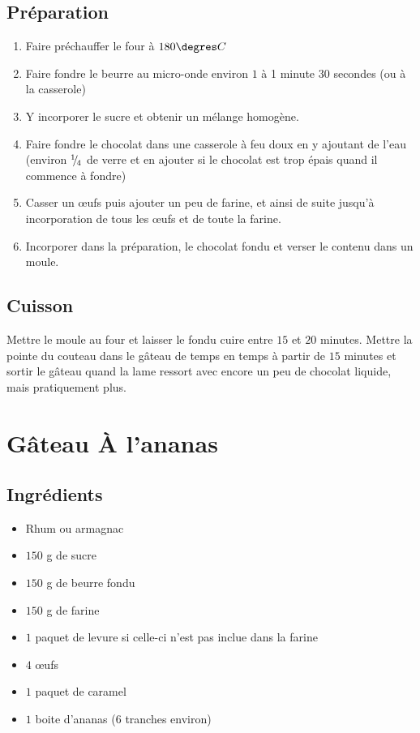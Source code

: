 \subsection*{Préparation}
\begin{enumerate}
\item Faire préchauffer le four à $180\degres C$
\item Faire fondre le beurre au micro-onde environ $1$ à 1 minute $30$ secondes (ou à la casserole)
\item Y incorporer le sucre et obtenir un mélange homogène.
\item Faire fondre le chocolat dans une casserole à feu doux en y ajoutant de l'eau (environ ${{}^{1\!\!}/ _{\!4}}$ de verre et en ajouter si le chocolat est trop épais quand il commence à fondre)
\item Casser un œufs puis ajouter un peu de farine, et ainsi de suite jusqu'à incorporation de tous les œufs et de toute la farine.
\item Incorporer dans la préparation, le chocolat fondu et verser le contenu dans un moule.
\end{enumerate}

\subsection*{Cuisson}
Mettre le moule au four et laisser le fondu cuire entre $15$ et $20$ minutes. Mettre la pointe du couteau dans le gâteau de temps en temps à partir de $15$ minutes et sortir le gâteau quand la lame ressort avec encore un peu de chocolat liquide, mais pratiquement plus.

\newpage
\section{Gâteau À l'ananas}
\subsection*{Ingrédients}

\begin{itemize}
\item Rhum ou armagnac
\item $150$ g de sucre
\item $150$ g de beurre fondu
\item $150$ g de farine
\item $1$ paquet de levure si celle-ci n'est pas inclue dans la farine
\item $4$ œufs
\item $1$ paquet de caramel
\item $1$ boite d'ananas ($6$ tranches environ)
\end{itemize}


